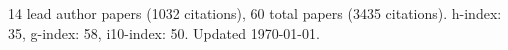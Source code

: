 14 lead author papers (1032 citations),
60 total papers (3435 citations).\newline
h-index: 35, g-index: 58, i10-index: 50. Updated \today.
